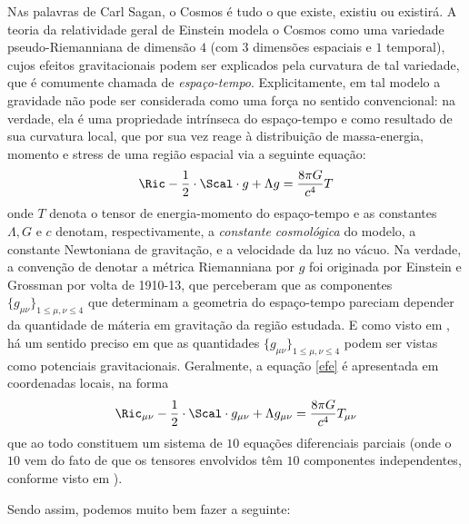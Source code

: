 

\setlength{\parindent}{3em}
\setlength{\parskip}{.2em}


\PlaceText{69mm}{38mm}{ \color{gal}\noindent\makebox[\linewidth]{\rule{2\paperwidth}{1pt}}}

\PlaceText{69mm}{14.3mm}{ \color{white}\noindent\makebox[\linewidth]{\rule{2\paperwidth}{12pt}}}

\PlaceText{69mm}{15mm}{ \color{gal}\noindent\makebox[\linewidth]{\rule{2\paperwidth}{1pt}}}

\PlaceText{69mm}{19mm}{ \color{white}\noindent\makebox[\linewidth]{\rule{2\paperwidth}{3pt}}}



\lettrine[nindent=2em,lines=1]{N} as palavras de Carl Sagan, o Cosmos é tudo o que existe, existiu ou existirá. A teoria da relatividade geral de Einstein modela o Cosmos como uma variedade pseudo-Riemanniana de dimensão $4$ (com $3$ dimensões espaciais e $1$ temporal), cujos efeitos gravitacionais podem ser explicados pela curvatura de tal variedade, que é comumente chamada de \textit{espaço-tempo}. Explicitamente, em tal modelo a gravidade não pode ser considerada como uma força no sentido convencional: na verdade, ela é uma propriedade intrínseca do espaço-tempo e  como resultado de sua curvatura local, que por sua vez reage à distribuição de massa-energia, momento e stress de uma região espacial via a seguinte equação:
\begin{equation}\label{efe}
\Ric - \frac{1}{2} \cdot \Scal \cdot g + \Lambda g = \frac{8 \pi G}{c^4} T
\end{equation}
onde $T$ denota o tensor de energia-momento do espaço-tempo e as constantes $\Lambda, G$ e $c$ denotam, respectivamente, a \emph{constante cosmológica} do modelo, a constante Newtoniana de gravitação, e a velocidade da luz no vácuo. Na verdade, a convenção de denotar a métrica Riemanniana por $g$ foi originada por Einstein e Grossman por volta de 1910-13, que perceberam que as componentes $\{g_{\mu \nu} \}_{1 \leq \mu, \nu \leq 4}$ que determinam a geometria do espaço-tempo pareciam depender da quantidade de máteria em gravitação da região estudada. E como visto em , há um sentido preciso em que as quantidades $\{g_{\mu \nu} \}_{1 \leq \mu, \nu \leq 4}$ podem ser vistas como potenciais gravitacionais. Geralmente, a equação \cref{efe} é apresentada em coordenadas locais, na forma
\[
\Ric_{\mu \nu} - \frac{1}{2} \cdot \Scal \cdot g_{\mu \nu} + \Lambda g_{\mu \nu} = \frac{8 \pi G}{c^4} T_{\mu \nu}
\]
que ao todo constituem um sistema de $10$ equações diferenciais parciais (onde o $10$ vem do fato de que os tensores envolvidos têm $10$ componentes independentes, conforme visto em ). \par 
Sendo assim, podemos muito bem fazer a seguinte:

